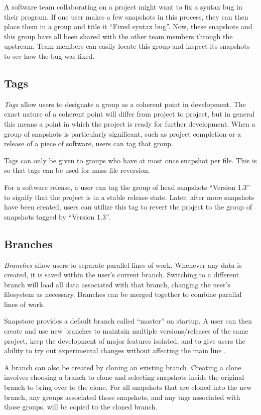 A software team collaborating on a project might want to fix a syntax bug in their program. If one user makes a few snapshots in this process, they can then place them in a group and title it ``Fixed syntax bug''. Now, these snapshots and this group have all been shared with the other team members through the upstream. Team members can easily locate this group and inspect its snapshots to see how the bug was fixed. 

\subsection{Tags}

\textit{Tags} allow users to designate a group as a coherent point in development. The exact nature of a coherent point will differ from project to project, but in general this means a point in which the project is ready for further development. When a group of snapshots is particularly significant, such as project completion or a release of a piece of software, users can tag that group.

Tags can only be given to groups who have at most once snapshot per file. This is so that tags can be used for mass file reversion.

For a software release, a user can tag the group of head snapshots ``Version 1.3'' to signify that the project is in a stable release state. Later, after more snapshots have been created, users can utilize this tag to revert the project to the group of snapshots tagged by ``Version 1.3''.

\subsection{Branches}

\textit{Branches} allow users to separate parallel lines of work. Whenever any data is created, it is saved within the user's current branch. Switching to a different branch will load all data associated with that branch, changing the user's filesystem as necessary. Branches can be merged together to combine parallal lines of work.

Snapstore provides a default branch called ``master'' on startup. A user can then create and use new branches to maintain multiple versions/releases of the same project, keep the development of major features isolated, and to give users the ability to try out experimental changes without affecting the main line \cite{RossoJackson}.

A branch can also be created by cloning an existing branch. Creating a clone involves choosing a branch to clone and selecting snapshots inside the original branch to bring over to the clone. For all snapshots that are cloned into the new branch, any groups associated those snapshots, and any tags associated with those groups, will be copied to the cloned branch.

